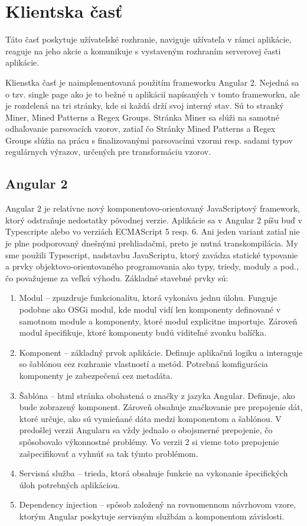 \chapter{Klientska časť}
Táto časť poskytuje užívateľské rozhranie, naviguje užívateľa v rámci aplikácie, reaguje na jeho akcie a komunikuje s vystaveným rozhraním serverovej časti aplikácie.
\par Klienstka časť je naimplementovaná použitím frameworku Angular 2. Nejedná sa o tzv. single page ako je to bežné u aplikácií napísaných v tomto frameworku, ale je rozdelená na tri stránky, kde si každá drží svoj interný stav. Sú to stranký Miner, Mined Patterns a Regex Groups. Stránka Miner sa slúži na samotné odhaľovanie parsovacích vzorov, zatiaľ čo Stránky Mined Patterns a Regex Groups slúžia na prácu s finalizovanými parsovacími vzormi resp. sadami typov regulárnych výrazov, určených pre transformáciu vzorov.


\section{Angular 2}
Angular 2 je relatívne nový komponentovo-orientovaný JavaScriptový framework, ktorý odstraňuje nedostatky pôvodnej verzie. Aplikácie sa v Angular 2 píšu buď v Typescripte alebo vo verziách ECMAScript 5 resp. 6. Ani jeden variant zatiaľ nie je plne podporovaný dnešnými prehliadačmi, preto je nutná transkompilácia. My sme použili Typescript, nadstavbu JavaScriptu, ktorý zavádza statické typovanie a prvky objektovo-orientovaného programovania ako typy, triedy, moduly a pod., čo považujeme za veľkú výhodu. Základné stavebné prvky sú:

\begin{enumerate}
 \item Modul -- zpuzdruje funkcionalitu, ktorá vykonáva jednu úlohu. Funguje podobne ako OSGi modul, kde modul vidí len komponenty definované v samotnom module a komponenty, ktoré modul explicitne importuje. Zároveň modul špecifikuje, ktoré komponenty budú viditeľné zvonku balíčka.
 \item Komponent -- základný prvok aplikácie. Definuje aplikačnú logiku a interaguje so šablónou cez rozhranie vlastností a metód. Potrebná komfigurácia komponenty je zabezpečená cez metadáta.
 \item Šablóna -- html stránka obohatená o značky z jazyka Angular. Definuje, ako bude zobrazený komponent. Zároveň obsahuje značkovanie pre prepojenie dát, ktoré určuje, ako sú vymieňané dáta medzi komponentom a šablónou. V predošlej verzii Angularu sa vždy jednalo o obojsmerné prepojenie, čo spôsobovalo výkonnostné problémy. Vo verzii 2 si vieme toto prepojenie zašpecifikovať a vyhnúť sa tak týmto problémom.
 \item Servisná služba -- trieda, ktorá obsahuje funkcie na vykonanie špecifických úloh potrebných aplikáciou. 
 \item Dependency injection -- spôsob založený na rovnomennom návrhovom vzore, ktorým Angular poskytuje servisným službám a komponentom závislosti.
\end{enumerate}

